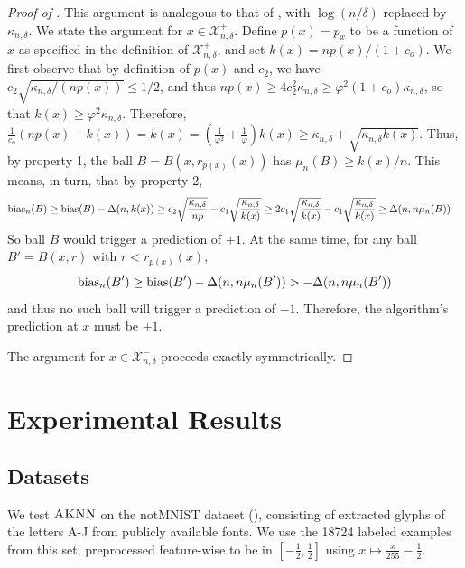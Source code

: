 \documentclass{article}
\def\X{{\mathcal X}}
\def\bias{{\rm bias}}
\newcommand{\algname}{\textsc{AKNN}}
\begin{document}
\begin{proof}[Proof of ]
This argument is analogous to that of , with $\log (n/\delta)$ replaced by $\kappa_{n, \delta}$. We state the argument for $x \in \X^+_{n,\delta}$. Define $p(x) = p_x$ to be a function of $x$ as specified in the definition of $\X^+_{n,\delta}$, and set $k(x) = np(x) / (1 + c_o)$. We first observe that by definition of $p(x)$ and $c_2$, we have $c_2 \sqrt{\kappa_{n, \delta}/(n p(x))} \leq 1/2$, and thus $np(x) \geq 4 c_2^2 \kappa_{n, \delta} \geq \varphi^2 (1+c_o) \kappa_{n, \delta}$, so that $k(x) \geq \varphi^2 \kappa_{n, \delta}$. Therefore, $\frac{1}{c_o} (np(x) - k(x)) = k(x) = \left( \frac{1}{\varphi^2} + \frac{1}{\varphi} \right) k(x) \geq \kappa_{n, \delta} + \sqrt{ \kappa_{n, \delta} k(x) }$. Thus, by property 1, the ball $B = B(x, r_{p(x)} (x))$ has $\mu_n(B) \geq k(x)/n$. This means, in turn, that by property 2, 
\begin{align*}
\bias_n(B) &\geq \bias(B) - \Delta(n, k(x) ) 
\geq c_2 \sqrt{\frac{\kappa_{n, \delta}}{np}} - c_1 \sqrt{\frac{\kappa_{n, \delta}}{k(x)}} 
\geq 2c_1 \sqrt{\frac{\kappa_{n, \delta}}{k(x)}} - c_1 \sqrt{\frac{\kappa_{n, \delta}}{k(x)}} 
\geq \Delta(n, n \mu_n(B))
\end{align*}
So ball $B$ would trigger a prediction of $+1$.
At the same time, for any ball $B' = B(x, r)$ with $r < r_{p(x)} (x)$,
$$ \bias_n(B') \geq \bias(B') - \Delta(n, n \mu_n(B')) > -\Delta(n, n \mu_n(B')) $$
and thus no such ball will trigger a prediction of $-1$. Therefore, the algorithm's prediction at $x$ must be $+1$.

The argument for $x \in \X^-_{n,\delta}$ proceeds exactly symmetrically. 
\end{proof}
\fi



\section{Experimental Results}
\label{sec:experimentappendix}

\subsection{Datasets}

We test $\algname$ on the notMNIST dataset (\cite{notMNIST}), consisting of extracted glyphs of the letters A-J from publicly available fonts. We use the 18724 labeled examples from this set, preprocessed feature-wise to be in $[-\frac{1}{2}, \frac{1}{2}]$ using $x \mapsto \frac{x}{255} - \frac{1}{2}$.
\end{document}

